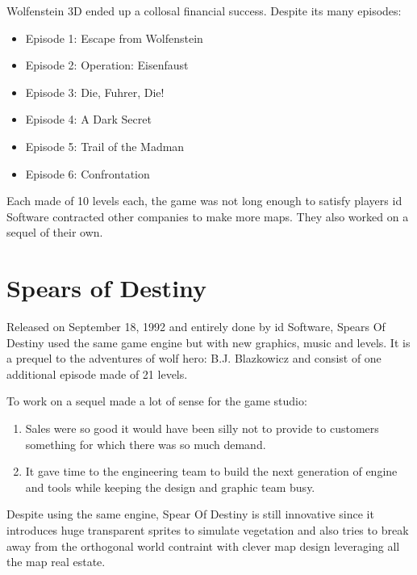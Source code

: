 \documentclass[book.tex]{subfiles}
\begin{document}
Wolfenstein 3D ended up a collosal financial success. Despite its many episodes:\\
\par
\begin{itemize}
\item Episode 1: Escape from Wolfenstein
\item Episode 2: Operation: Eisenfaust
\item Episode 3: Die, Fuhrer, Die!
\item Episode 4: A Dark Secret
\item Episode 5: Trail of the Madman
\item Episode 6: Confrontation
\end{itemize}
Each made of 10 levels each,  the game was not long enough to satisfy players id Software contracted other companies to make more maps. They also worked on a sequel of their own.

\section{Spears of Destiny}
Released on September 18, 1992 and entirely done by id Software, Spears Of Destiny used the same game engine but with new graphics, music and levels. It is a prequel to the adventures of wolf hero: B.J. Blazkowicz and consist of one additional episode made of 21 levels.\\
   \par
\begin{figure}[H]
\centering
 \end{figure}
 \par
 To work on a sequel made a lot of sense for the game studio:
 \begin{enumerate}
 \item Sales were so good it would have been silly not to provide to customers something for which there was so much demand.
 \item It gave time to the engineering team to build the next generation of engine and tools while keeping the design and graphic team busy.
 \end{enumerate}
Despite using the same engine, Spear Of Destiny is still innovative since it introduces huge transparent sprites to simulate vegetation and also tries to break away from the orthogonal world contraint with clever map design leveraging all the map real estate.
    \par
\begin{figure}[H]
\centering
 \end{figure}
 \par
\end{document}
